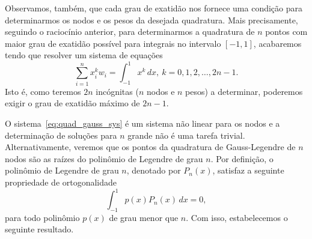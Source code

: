 Observamos, também, que cada grau de exatidão nos fornece uma condição para determinarmos os nodos e os pesos da desejada quadratura. Mais precisamente, seguindo o raciocínio anterior, para determinarmos a quadratura de $n$ pontos com maior grau de exatidão possível para integrais no intervalo $[-1, 1]$, acabaremos tendo que resolver um sistema de equações
\begin{equation}\label{eq:quad_gauss_sys}
  \sum_{i=1}^n x_i^kw_i = \int_{-1}^1 x^k\,dx,~k=0,1,2,\ldots, 2n-1.
\end{equation}
Isto é, como teremos $2n$ incógnitas ($n$ nodos e $n$ pesos) a determinar, poderemos exigir o grau de exatidão máximo de $2n-1$.

O sistema~\eqref{eq:quad_gauss_sys} é um sistema não linear para os nodos e a determinação de soluções para $n$ grande não é uma tarefa trivial. Alternativamente, veremos que os pontos da quadratura de Gauss-Legendre de $n$ nodos são as raízes do polinômio de Legendre de grau $n$. Por definição, o polinômio de Legendre de grau $n$, denotado por $P_n(x)$, satisfaz a seguinte propriedade de ortogonalidade
\begin{equation}\label{eq:ortogonalidade_pol_Legendre}
  \int_{-1}^1 p(x)P_n(x)\,dx = 0,
\end{equation}
para todo polinômio $p(x)$ de grau menor que $n$. Com isso, estabelecemos o seguinte resultado.

